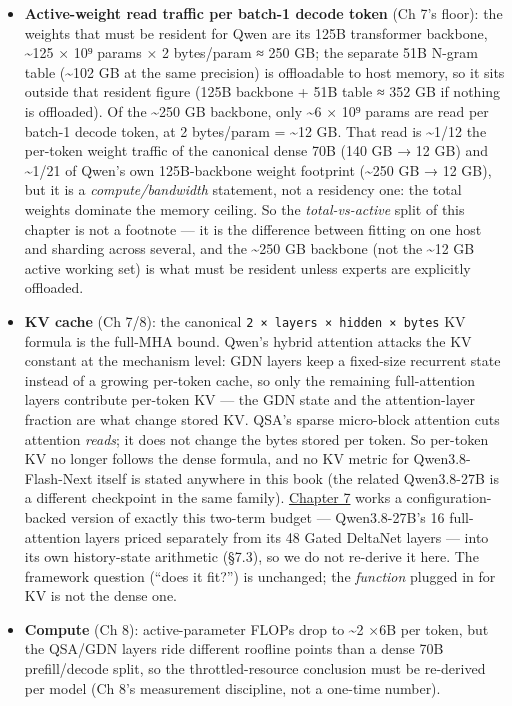 \begin{itemize}
\tightlist
\item
  \textbf{Active-weight read traffic per batch-1 decode token} (Ch 7's
  floor): the weights that must be resident for Qwen are its 125B
  transformer backbone, \textasciitilde125 × 10⁹ params × 2 bytes/param
  ≈ 250 GB; the separate 51B N-gram table (\textasciitilde102 GB at the
  same precision) is offloadable to host memory, so it sits outside that
  resident figure (125B backbone + 51B table ≈ 352 GB if nothing is
  offloaded). Of the \textasciitilde250 GB backbone, only
  \textasciitilde6 × 10⁹ params are read per batch-1 decode token, at 2
  bytes/param = \textasciitilde12 GB. That read is \textasciitilde1/12
  the per-token weight traffic of the canonical dense 70B (140 GB → 12
  GB) and \textasciitilde1/21 of Qwen's own 125B-backbone weight
  footprint (\textasciitilde250 GB → 12 GB), but it is a
  \emph{compute/bandwidth} statement, not a residency one: the total
  weights dominate the memory ceiling. So the \emph{total-vs-active}
  split of this chapter is not a footnote --- it is the difference
  between fitting on one host and sharding across several, and the
  \textasciitilde250 GB backbone (not the \textasciitilde12 GB active
  working set) is what must be resident unless experts are explicitly
  offloaded.
\item
  \textbf{KV cache} (Ch 7/8): the canonical
  \texttt{2\ ×\ layers\ ×\ hidden\ ×\ bytes} KV formula is the full-MHA
  bound. Qwen's hybrid attention attacks the KV constant at the
  mechanism level: GDN layers keep a fixed-size recurrent state instead
  of a growing per-token cache, so only the remaining full-attention
  layers contribute per-token KV --- the GDN state and the
  attention-layer fraction are what change stored KV. QSA's sparse
  micro-block attention cuts attention \emph{reads}; it does not change
  the bytes stored per token. So per-token KV no longer follows the
  dense formula, and no KV metric for Qwen3.8-Flash-Next itself is
  stated anywhere in this book (the related Qwen3.8-27B is a different
  checkpoint in the same family). \hyperref[chap:7]{Chapter 7} works a configuration-backed
  version of exactly this two-term budget --- Qwen3.8-27B's 16
  full-attention layers priced separately from its 48 Gated DeltaNet
  layers --- into its own history-state arithmetic (§7.3), so we do not
  re-derive it here. The framework question (``does it fit?'') is
  unchanged; the \emph{function} plugged in for KV is not the dense one.
\item
  \textbf{Compute} (Ch 8): active-parameter FLOPs drop to
  \textasciitilde2 ×6B per token, but the QSA/GDN layers ride different
  roofline points than a dense 70B prefill/decode split, so the
  throttled-resource conclusion must be re-derived per model (Ch 8's
  measurement discipline, not a one-time number).
\end{itemize}

